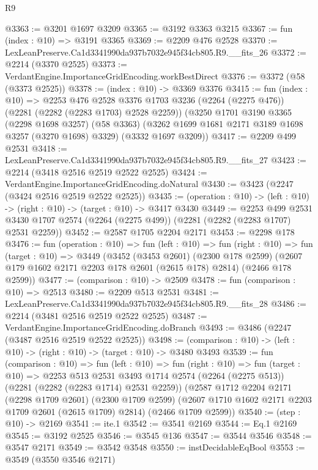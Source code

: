 \begin{lexlean}{R9}
\begin{coremodule}
@3363 := @3201 @1697 @3209
@3365 := @3192 @3363 @3215
@3367 := fun (index : @10) => @3191 @3365
@3369 := @2209 @476 @2528
@3370 := LexLeanPreserve.Ca1d3341990da937b7032e945f34cb805.R9.__fits_26
@3372 := @2214 (@3370 @2525)
@3373 := VerdantEngine.ImportanceGridEncoding.workBestDirect
@3376 := @3372 (@58 (@3373 @2525))
@3378 := (index : @10) -> @3369 @3376
@3415 := fun (index : @10) =>
  @2253
    @476
    @2528
    @3376
    @1703
    @3236
    (@2264 (@2275 @476))
    (@2281 (@2282 (@2283 @1703) @2528 @2259))
    (@3250
      @1701
      @3190
      @3365
      (@2298 @1698 @3257)
      (@58 @3363)
      (@3262 @1699 @1681 @2171 @3189 @1698 @3257 (@3270 @1698) @3329)
      (@3332 @1697 @3209))
@3417 := @2209 @499 @2531
@3418 := LexLeanPreserve.Ca1d3341990da937b7032e945f34cb805.R9.__fits_27
@3423 := @2214 (@3418 @2516 @2519 @2522 @2525)
@3424 := VerdantEngine.ImportanceGridEncoding.doNatural
@3430 := @3423 (@2247 (@3424 @2516 @2519 @2522 @2525))
@3435 := (operation : @10) -> (left : @10) -> (right : @10) -> (target : @10) -> @3417 @3430
@3449 := @2253
    @499
    @2531
    @3430
    @1707
    @2574
    (@2264 (@2275 @499))
    (@2281 (@2282 (@2283 @1707) @2531 @2259))
@3452 := @2587 @1705 @2204 @2171
@3453 := @2298 @178
@3476 := fun (operation : @10) =>
  fun (left : @10) =>
  fun (right : @10) =>
  fun (target : @10) =>
  @3449
    (@3452
      (@3453 @2601)
      (@2300 @178 @2599)
      (@2607 @179 @1602 @2171 @2203 @178 @2601 (@2615 @178) @2814)
      (@2466 @178 @2599))
@3477 := (comparison : @10) -> @2509
@3478 := fun (comparison : @10) => @2513
@3480 := @2209 @513 @2531
@3481 := LexLeanPreserve.Ca1d3341990da937b7032e945f34cb805.R9.__fits_28
@3486 := @2214 (@3481 @2516 @2519 @2522 @2525)
@3487 := VerdantEngine.ImportanceGridEncoding.doBranch
@3493 := @3486 (@2247 (@3487 @2516 @2519 @2522 @2525))
@3498 := (comparison : @10) -> (left : @10) -> (right : @10) -> (target : @10) -> @3480 @3493
@3539 := fun (comparison : @10) =>
  fun (left : @10) =>
  fun (right : @10) =>
  fun (target : @10) =>
  @2253
    @513
    @2531
    @3493
    @1714
    @2574
    (@2264 (@2275 @513))
    (@2281 (@2282 (@2283 @1714) @2531 @2259))
    (@2587
      @1712
      @2204
      @2171
      (@2298 @1709 @2601)
      (@2300 @1709 @2599)
      (@2607 @1710 @1602 @2171 @2203 @1709 @2601 (@2615 @1709) @2814)
      (@2466 @1709 @2599))
@3540 := (step : @10) -> @2169
@3541 := ite.{1}
@3542 := @3541 @2169
@3544 := Eq.{1} @2169
@3545 := @3192 @2525
@3546 := @3545 @136
@3547 := @3544 @3546
@3548 := @3547 @2171
@3549 := @3542 @3548
@3550 := instDecidableEqBool
@3553 := @3549 (@3550 @3546 @2171)

\end{coremodule}
\end{lexlean}
